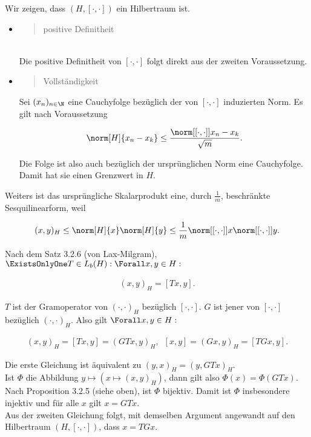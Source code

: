 \begin{solution}

Wir zeigen, dass $(H, [\cdot, \cdot])$ ein Hilbertraum ist.

\begin{itemize}

  \item
  \blockquote{positive Definitheit}: \\

  Die positive Definitheit von $[\cdot, \cdot]$ folgt direkt aus der zweiten Voraussetzung. \\

  \item
  \blockquote{Vollständigkeit}:

  Sei $(x_n)_{n \in \N}$ eine Cauchyfolge bezüglich der von $[\cdot, \cdot]$ induzierten Norm.
  Es gilt nach Voraussetzung

  \begin{align*}
      \norm[H]{x_n - x_k}
      \leq
      \frac
      {
        \norm[{[\cdot, \cdot]}]{x_n - x_k}
      }{
        \sqrt{m}
      }.
  \end{align*}

  Die Folge ist also auch bezüglich der ursprünglichen Norm eine Cauchyfolge.
  Damit hat sie einen Grenzwert in $H$.

\end{itemize}

Weiters ist das ursprüngliche Skalarprodukt eine, durch $\frac{1}{m}$, beschränkte Sesquilinearform, weil

\begin{align*}
  (x, y)_H
  \leq
  \norm[H]{x} \norm[H]{y}
  \leq
  \frac{1}{m} \norm[{[\cdot, \cdot]}]{x} \norm[{[\cdot, \cdot]}]{y}.
\end{align*}


Nach dem Satz 3.2.6 (von Lax-Milgram), $\ExistsOnlyOne T \in L_b(H): \Forall x, y \in H:$

\begin{align*}
    (x, y)_H = [T x, y].
\end{align*}

$T$ ist der Gramoperator von $(\cdot, \cdot)_H$ bezüglich $[\cdot, \cdot]$.
$G$ ist jener von $[\cdot, \cdot]$ bezüglich $(\cdot, \cdot)_H$.
Also gilt $\Forall x, y \in H:$

\begin{align*}
    (x, y)_H = [T x, y] = (G T x, y)_H,
    \enspace
    [x, y] = (G x, y)_H = [T G x, y].
\end{align*}

Die erste Gleichung ist äquivalent zu $(y, x)_H = (y, GTx)_H$. \\

Ist $\Phi$ die Abbildung $y \mapsto (x \mapsto (x, y)_H)$, dann gilt also $\Phi(x) = \Phi(GTx)$.
Nach Proposition 3.2.5 (siehe oben), ist $\Phi$ bijektiv.
Damit ist $\Phi$ insbesondere injektiv und für alle $x$ gilt $x = GTx$. \\

Aus der zweiten Gleichung folgt, mit demselben Argument angewandt auf den Hilbertraum $(H, [\cdot, \cdot])$, dass $x = T G x.$

\end{solution}

